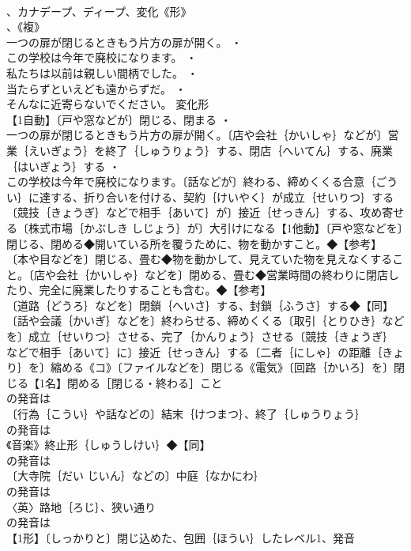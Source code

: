 \documentclass[8pt]{extreport}
\begin{document}
\begin{CJK}{UTF8}{min}
\\	、カナデープ、ディープ、変化《形》
\\	、《複》
\\	一つの扉が閉じるときもう片方の扉が開く。 ・
\\	この学校は今年で廃校になります。 ・
\\	私たちは以前は親しい間柄でした。 ・
\\	当たらずといえども遠からずだ。 ・
\\	そんなに近寄らないでください。	変化形 
\\	【1自動】〔戸や窓などが〕閉じる、閉まる ・
\\	一つの扉が閉じるときもう片方の扉が開く。〔店や会社｛かいしゃ｝などが〕営業｛えいぎょう｝を終了｛しゅうりょう｝する、閉店｛へいてん｝する、廃業｛はいぎょう｝する ・
\\	この学校は今年で廃校になります。〔話などが〕終わる、締めくくる合意｛ごうい｝に達する、折り合いを付ける、契約｛けいやく｝が成立｛せいりつ｝する〔競技｛きょうぎ｝などで相手｛あいて｝が〕接近｛せっきん｝する、攻め寄せる〔株式市場｛かぶしき しじょう｝が〕大引けになる【1他動】〔戸や窓などを〕閉じる、閉める◆開いている所を覆うために、物を動かすこと。◆【参考】
\\	〔本や目などを〕閉じる、畳む◆物を動かして、見えていた物を見えなくすること。〔店や会社｛かいしゃ｝などを〕閉める、畳む◆営業時間の終わりに閉店したり、完全に廃業したりすることも含む。◆【参考】
\\	〔道路｛どうろ｝などを〕閉鎖｛へいさ｝する、封鎖｛ふうさ｝する◆【同】
\\	〔話や会議｛かいぎ｝などを〕終わらせる、締めくくる〔取引｛とりひき｝などを〕成立｛せいりつ｝させる、完了｛かんりょう｝させる〔競技｛きょうぎ｝などで相手｛あいて｝に〕接近｛せっきん｝する〔二者｛にしゃ｝の距離｛きょり｝を〕縮める《コ》〔ファイルなどを〕閉じる《電気》〔回路｛かいろ｝を〕閉じる【1名】閉める［閉じる・終わる］こと
\\	の発音は
\\	〔行為｛こうい｝や話などの〕結末｛けつまつ｝、終了｛しゅうりょう｝
\\	の発音は
\\	《音楽》終止形｛しゅうしけい｝◆【同】
\\	の発音は
\\	〔大寺院｛だい じいん｝などの〕中庭｛なかにわ｝
\\	の発音は
\\	〈英〉路地｛ろじ｝、狭い通り
\\	の発音は
\\	【1形】〔しっかりと〕閉じ込めた、包囲｛ほうい｝したレベル1、発音

\end{CJK}
\end{document}
